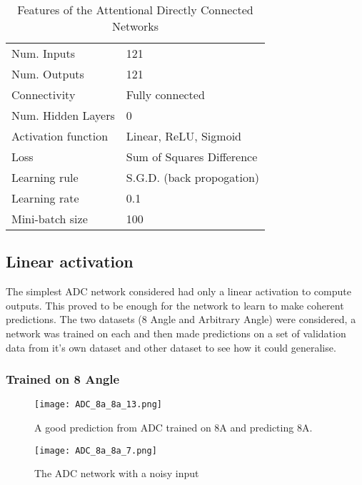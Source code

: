 \begin{table}[h]
\centering
\begin{tabular}{ | l | l | }
    \hline
    Num. Inputs & 121 \\
    Num. Outputs & 121 \\
    Connectivity & Fully connected \\
    Num. Hidden Layers & 0 \\
    Activation function & Linear, ReLU, Sigmoid \\
    Loss & Sum of Squares Difference \\
    Learning rule & S.G.D. (back propogation) \\
    Learning rate & 0.1 \\
    Mini-batch size & 100 \\
    \hline
\end{tabular}
\caption{Features of the Attentional Directly Connected Networks}
\label{tb:attnet1def}
\end{table}

\subsection{Linear activation}
The simplest ADC network considered had only a linear activation to compute outputs. 
This proved to be enough for the network to learn to make coherent predictions. 
The two datasets (8 Angle and Arbitrary Angle) were considered, a network was trained on each and then made predictions on a set of validation data from it's own dataset and other dataset to see how it could generalise.

\subsubsection{Trained on 8 Angle}

\begin{figure}
    \centering
    \texttt{[image: ADC\_8a\_8a\_13.png]}
    \caption{A good prediction from ADC trained on 8A and predicting 8A.}
    \label{fig:ADC_8a_8a_crct} 
\end{figure}

\begin{figure}
    \centering
    \texttt{[image: ADC\_8a\_8a\_7.png]}
    \caption{The ADC network with a noisy input}
    \label{fig:ADC_8a_8a_noisy}
\end{figure}

